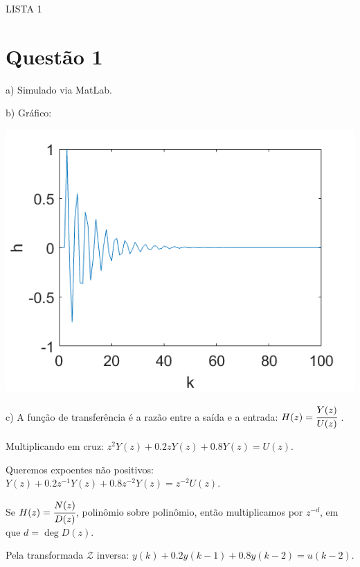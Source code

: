\documentclass{rbfin}
\begin{document}
\rbfe{}


\large

\begin{center}
LISTA 1
\end{center}

\normalsize

\doublespacing

\section*{Questão 1}

a) Simulado via MatLab.

b) Gráfico:

\begin{center}
\includegraphics[scale=0.666]{q1}
\end{center}

c) A função de transferência é a razão entre a saída e a entrada: $H(z) = \cfrac{Y(z)}{U(z)}$ .

Multiplicando em cruz: $z^2 Y(z) + 0.2 z Y(z) + 0.8 Y(z) = U(z)$.

Queremos expoentes não positivos: $Y(z) + 0.2 z^{-1} Y(z) + 0.8 z^{-2} Y(z) = z^{-2} U(z)$.

Se $H(z) = \cfrac{N(z)}{D(z)}$, polinômio sobre polinômio, então multiplicamos por $z^{-d}$, em que $d = \deg D(z)$.

Pela transformada $\mathcal{Z}$ inversa: $y(k) + 0.2 y(k - 1) + 0.8 y(k - 2) = u(k - 2)$. 
\end{document}
